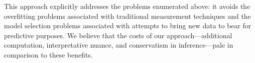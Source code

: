This approach explicitly addresses the problems enumerated above: it avoids the overfitting problems associated with traditional measurement techniques and the model selection problems associated with attempts to bring new data to bear for predictive purposes. 
We believe that the costs of our approach---additional computation, interpretative nuance, and conservatism in inference---pale in comparison to these benefits. 
